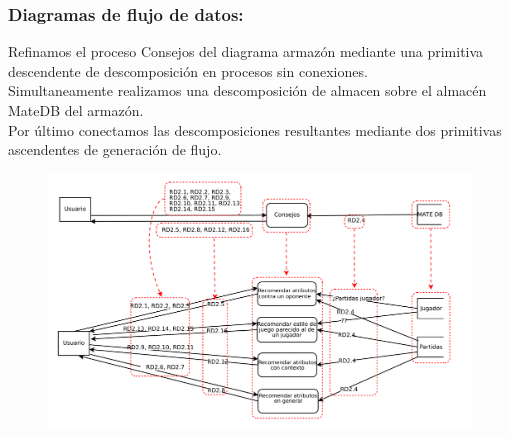 \subsubsection{Diagramas de flujo de datos:}

Refinamos el proceso Consejos del diagrama armazón mediante
una primitiva descendente de descomposición en procesos sin conexiones.\\
Simultaneamente realizamos una descomposición de almacen sobre el
almacén MateDB del armazón.\\
Por último conectamos las descomposiciones resultantes mediante dos
primitivas ascendentes de generación de flujo.\\ 
 
\begin{figure}
\centering
\includegraphics[width=0.7\linewidth]{../Diagramas/pdf/RefinamientoConsejos.pdf}
\caption[Refinamiento del sistema de inclusión]{}
\caption{}
\label{fig:RefinamientoInclusion}
\end{figure}
